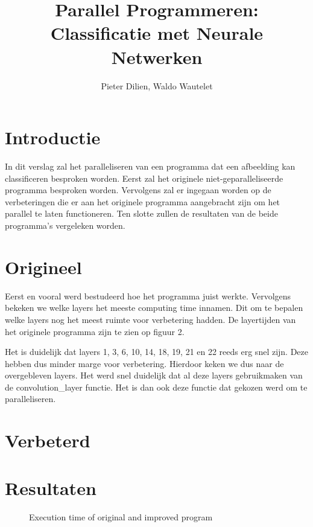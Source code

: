 \documentclass[a4paper, 12pt, one column]{article}
\title{Parallel Programmeren: Classificatie met Neurale Netwerken}
\author{Pieter Dilien, Waldo Wautelet}
\begin{document}
\maketitle

\section{Introductie}
In dit verslag zal het paralleliseren van een programma dat een afbeelding kan classificeren besproken worden.
Eerst zal het originele niet-geparalleliseerde programma besproken worden. Vervolgens zal er ingegaan worden op 
de verbeteringen die er aan het originele programma aangebracht zijn om het parallel te laten functioneren. Ten slotte
zullen de resultaten van de beide programma's vergeleken worden.

\section{Origineel}
Eerst en vooral werd bestudeerd hoe het programma juist werkte. Vervolgens bekeken we welke layers het meeste computing time 
innamen. Dit om te bepalen welke layers nog het meest ruimte voor verbetering hadden. De layertijden van het originele programma
zijn te zien op figuur 2.

\noindent
Het is duidelijk dat layers 1, 3, 6, 10, 14, 18, 19, 21 en 22 reeds erg snel zijn. Deze hebben dus minder marge voor verbetering.
Hierdoor keken we dus naar de overgebleven layers. Het werd snel duidelijk dat al deze layers gebruikmaken van de convolution\_layer functie.
Het is dan ook deze functie dat gekozen werd om te paralleliseren.

\section{Verbeterd}

\section{Resultaten}

\begin{figure}
  \centering
  \caption{Execution time of original and improved program}
\end{figure}
\end{document}
